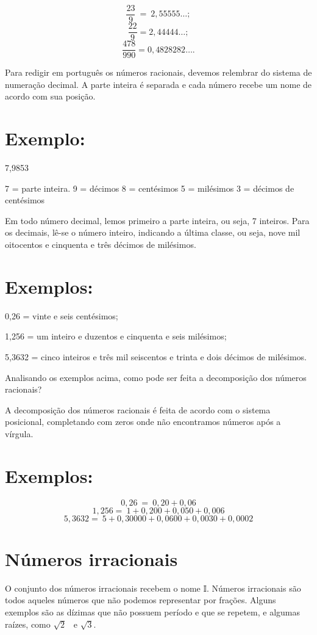 $$\frac{23}{9}\  = \ 2,55555\ldots;$$
$$\frac{22}{9} = 2,44444\ldots;$$
$$\frac{478}{990} = 0,4828282\ldots{}.$$

Para redigir em português os números racionais, devemos relembrar do
sistema de numeração decimal. A parte inteira é separada e cada número
recebe um nome de acordo com sua posição.~

\section{Exemplo:} 


7,9853

7 = parte inteira. 9 = décimos 8 = centésimos 5 = milésimos 3 = décimos
de centésimos

Em todo número decimal, lemos primeiro a parte inteira, ou seja, 7
inteiros. Para os decimais, lê-se o número inteiro, indicando a última
classe, ou seja, nove mil oitocentos e cinquenta e três décimos de
milésimos.

\section{Exemplos:}

0,26 = vinte e seis centésimos;

1,256 = um inteiro e duzentos e cinquenta e seis milésimos;

5,3632 = cinco inteiros e três mil seiscentos e trinta e dois décimos de
milésimos.

Analisando os exemplos acima, como pode ser feita a decomposição dos
números racionais?

A decomposição dos números racionais é feita de acordo com o sistema
posicional, completando com zeros onde não encontramos números após a
vírgula.~

\section{Exemplos:}

$$0,26\  = \ 0,20 + 0,06$$
$$1,256 = \ 1 + 0,200 + 0,050 + 0,006$$
$$5,3632 = \ 5 + 0,30000 + 0,0600 + 0,0030 + 0,0002$$

\section{Números irracionais}

O conjunto dos números irracionais recebem o nome 𝕀. Números irracionais
são todos aqueles números que não podemos representar por frações.
Alguns exemplos são as dízimas que não possuem período e que se repetem,
e algumas raízes, como $\sqrt{2}$ \ e $\sqrt{3}$.

